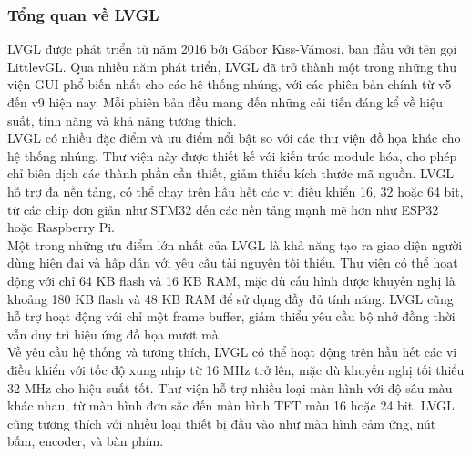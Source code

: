\subsubsection{Tổng quan về LVGL}
\tab LVGL được phát triển từ năm 2016 bởi Gábor Kiss-Vámosi, ban đầu với tên gọi LittlevGL. Qua nhiều năm phát triển, LVGL đã trở thành một trong những thư viện GUI phổ biến nhất cho các hệ thống nhúng, với các phiên bản chính từ v5 đến v9 hiện nay. Mỗi phiên bản đều mang đến những cải tiến đáng kể về hiệu suất, tính năng và khả năng tương thích.\\
\tab LVGL có nhiều đặc điểm và ưu điểm nổi bật so với các thư viện đồ họa khác cho hệ thống nhúng. Thư viện này được thiết kế với kiến trúc module hóa, cho phép chỉ biên dịch các thành phần cần thiết, giảm thiểu kích thước mã nguồn. LVGL hỗ trợ đa nền tảng, có thể chạy trên hầu hết các vi điều khiển 16, 32 hoặc 64 bit, từ các chip đơn giản như STM32 đến các nền tảng mạnh mẽ hơn như ESP32 hoặc Raspberry Pi.\\
\tab Một trong những ưu điểm lớn nhất của LVGL là khả năng tạo ra giao diện người dùng hiện đại và hấp dẫn với yêu cầu tài nguyên tối thiểu. Thư viện có thể hoạt động với chỉ 64 KB flash và 16 KB RAM, mặc dù cấu hình được khuyến nghị là khoảng 180 KB flash và 48 KB RAM để sử dụng đầy đủ tính năng. LVGL cũng hỗ trợ hoạt động với chỉ một frame buffer, giảm thiểu yêu cầu bộ nhớ đồng thời vẫn duy trì hiệu ứng đồ họa mượt mà.\\
\tab Về yêu cầu hệ thống và tương thích, LVGL có thể hoạt động trên hầu hết các vi điều khiển với tốc độ xung nhịp từ 16 MHz trở lên, mặc dù khuyến nghị tối thiểu 32 MHz cho hiệu suất tốt. Thư viện hỗ trợ nhiều loại màn hình với độ sâu màu khác nhau, từ màn hình đơn sắc đến màn hình TFT màu 16 hoặc 24 bit. LVGL cũng tương thích với nhiều loại thiết bị đầu vào như màn hình cảm ứng, nút bấm, encoder, và bàn phím.
